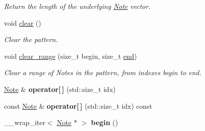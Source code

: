 \begin{DoxyCompactItemize}
\begin{DoxyCompactList}\small\item\em Return the length of the underlying \hyperlink{class_note}{Note} vector. \end{DoxyCompactList}\item 
void \hyperlink{class_pattern_a766e2ec0a5951d0cea3939a026162924}{clear} ()\hypertarget{class_pattern_a766e2ec0a5951d0cea3939a026162924}{}\label{class_pattern_a766e2ec0a5951d0cea3939a026162924}

\begin{DoxyCompactList}\small\item\em Clear the pattern. \end{DoxyCompactList}\item 
void \hyperlink{class_pattern_a39aa3043cbe604dbc140c001d8afaa15}{clear\+\_\+range} (size\+\_\+t begin, size\+\_\+t \hyperlink{class_pattern_a2ed124ec2784442b01ea22f9b04bbeaa}{end})\hypertarget{class_pattern_a39aa3043cbe604dbc140c001d8afaa15}{}\label{class_pattern_a39aa3043cbe604dbc140c001d8afaa15}

\begin{DoxyCompactList}\small\item\em Clear a range of Notes in the pattern, from indexes begin to end. \end{DoxyCompactList}\item 
\hyperlink{class_note}{Note} \& {\bfseries operator\mbox{[}$\,$\mbox{]}} (std\+::size\+\_\+t idx)\hypertarget{class_pattern_aee209f505e0be32dfc7d781436571569}{}\label{class_pattern_aee209f505e0be32dfc7d781436571569}

\item 
const \hyperlink{class_note}{Note} \& {\bfseries operator\mbox{[}$\,$\mbox{]}} (std\+::size\+\_\+t idx) const \hypertarget{class_pattern_a575538fbf12d8ed5406029b4f1c30910}{}\label{class_pattern_a575538fbf12d8ed5406029b4f1c30910}

\item 
\+\_\+\+\_\+wrap\+\_\+iter$<$ \hyperlink{class_note}{Note} $\ast$ $>$ {\bfseries begin} ()\hypertarget{class_pattern_a8281a6d97bbaa94f6d11ad4d52ab5bb8}{}\label{class_pattern_a8281a6d97bbaa94f6d11ad4d52ab5bb8}


\end{DoxyCompactItemize}
